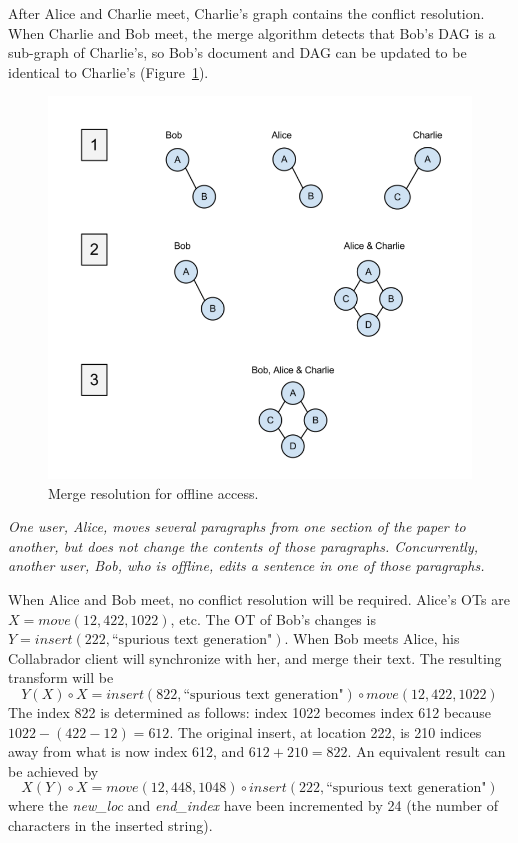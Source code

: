 \documentclass[11pt,titlepage]{article}
\begin{document}
After Alice and Charlie meet, Charlie's graph contains the conflict
resolution.  When Charlie and Bob meet, the merge algorithm detects
that Bob's DAG is a sub-graph of Charlie's, so Bob's document and DAG
can be updated to be identical to Charlie's (Figure~\ref{fig:image}).

\begin{figure}[h]
  \centering
  \includegraphics[width=5in]{image.png}
  \caption{Merge resolution for offline access.   \label{fig:image}}
\end{figure}

\vspace{5mm}
\noindent
\emph{One user, Alice, moves several paragraphs from one section of
  the paper to another, but does not change the contents of those
  paragraphs. Concurrently, another user, Bob, who is offline, edits a
  sentence in one of those paragraphs.}

\vspace{5mm}

When Alice and Bob meet, no conflict resolution will be
required. Alice's OTs are $X = move(12,422, 1022)$, etc.  The OT of
Bob's changes is $Y = insert(222, \text{``spurious text generation"})$. When Bob
meets Alice, his Collabrador client will synchronize with her, and
merge their text. The resulting transform will be 
\begin{equation*}
Y(X) \circ X = insert(822,
\text{``spurious text generation"}) \circ move(12,422, 1022)
\end{equation*}
The index 822 is determined as follows: index 1022 becomes index 612 because
\(1022-(422-12) = 612.\)  The original insert, at location 222, is 210
indices away from what is now index 612, and \(612+210 = 822.\) An equivalent
result can be achieved by
\begin{equation*}
X(Y) \circ X = move(12,448,1048) \circ insert(222, \text{``spurious text generation"})
\end{equation*}
where the \textit{new\_loc} and \textit{end\_index} have been incremented by 24 (the number of
characters in the inserted string).
\end{document}
